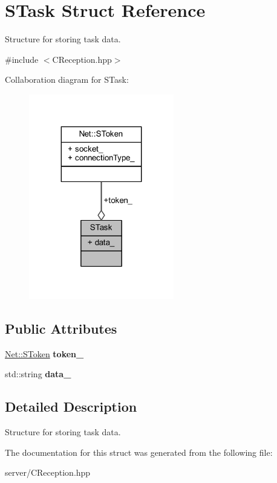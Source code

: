 \hypertarget{struct_s_task}{}\section{S\+Task Struct Reference}
\label{struct_s_task}


Structure for storing task data.  




{\ttfamily \#include $<$C\+Reception.\+hpp$>$}



Collaboration diagram for S\+Task\+:
\nopagebreak
\begin{figure}[H]
\begin{center}
\leavevmode
\includegraphics[width=179pt]{struct_s_task__coll__graph}
\end{center}
\end{figure}
\subsection*{Public Attributes}
\begin{DoxyCompactItemize}
\item 
\mbox{\label{struct_s_task_ab0ca736167067e374c4e8860834d515b}} 
\mbox{\hyperlink{struct_net_1_1_s_token}{Net\+::\+S\+Token}} {\bfseries token\+\_\+}
\item 
\mbox{\label{struct_s_task_a67c3bf7df4705a2b43270f32a90f824a}} 
std\+::string {\bfseries data\+\_\+}
\end{DoxyCompactItemize}


\subsection{Detailed Description}
Structure for storing task data. 

The documentation for this struct was generated from the following file\+:\begin{DoxyCompactItemize}
\item 
server/C\+Reception.\+hpp\end{DoxyCompactItemize}
